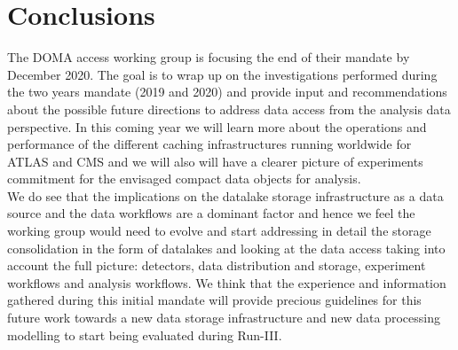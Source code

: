 \section{Conclusions}
The DOMA access working group is focusing the end of their mandate by December 2020. The goal is to wrap up on the investigations performed during the two years mandate (2019 and 2020) and provide input and recommendations about the possible future directions to address data access from the analysis data perspective. In this coming year we will learn more about the operations and performance of the different caching infrastructures running worldwide for ATLAS and CMS and we will also will have a clearer picture of experiments commitment for the envisaged compact data objects for analysis.\\
We do see that the implications on the datalake storage infrastructure as a data source and the data workflows are a dominant factor and hence we feel the working group would need to evolve and start addressing in detail the storage consolidation in the form of datalakes and looking at the data access taking into account the full picture: detectors, data distribution and storage, experiment workflows and analysis workflows. We think that the experience and information gathered during this initial mandate will provide precious guidelines for this future work towards a new data storage infrastructure and new data processing modelling to start being evaluated during Run-III.